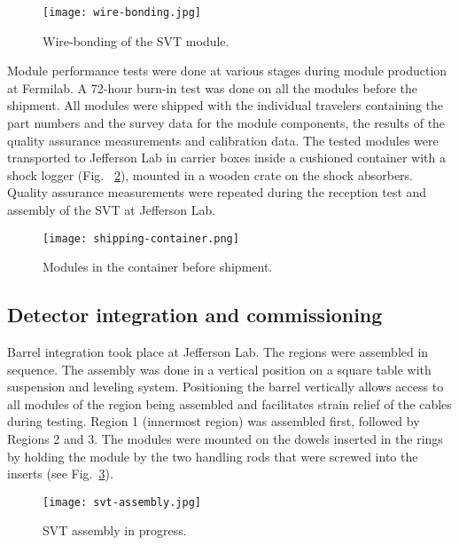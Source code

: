 \begin{figure}[hbt] 
\centering 
\texttt{[image: wire-bonding.jpg]}
\caption{Wire-bonding of the SVT module.}
\label{fig:wire-bonding}
\end{figure}

Module performance tests were done at various stages during module production at Fermilab. A 72-hour burn-in test was done on all the modules before the shipment. All modules were shipped with the individual travelers containing the part numbers and the survey data for the module components, the results of the quality assurance measurements and calibration data. The tested modules were transported to Jefferson Lab in carrier boxes inside a cushioned container with a shock logger (Fig. ~\ref{fig:shipping-container}), mounted in a wooden crate on the shock absorbers. Quality assurance measurements were repeated during the reception test and assembly of the SVT at Jefferson Lab. 

\begin{figure}[hbt] 
\centering 
\texttt{[image: shipping-container.png]}
\caption{Modules in the container before shipment.}
\label{fig:shipping-container}
\end{figure}

\subsection{Detector integration and commissioning}

Barrel integration took place at Jefferson Lab. The regions were assembled in sequence. The assembly was done in a vertical position on a square table with suspension and leveling system. Positioning the barrel vertically allows access to all modules of the region being assembled and facilitates strain relief of the cables during testing. Region 1 (innermost region) was assembled first, followed by Regions 2 and 3. The modules were mounted on the dowels inserted in the rings by holding the module by the two handling rods that were screwed into the inserts (see Fig.~\ref{fig:svt-assembly}). 

\begin{figure}[hbt] 
\centering 
\texttt{[image: svt-assembly.jpg]}
\caption{SVT assembly in progress.}
\label{fig:svt-assembly}
\end{figure}

